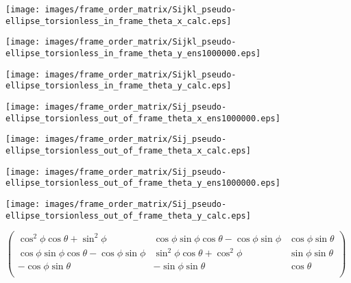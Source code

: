 \documentclass[a4paper,11pt,twoside,openright]{book}
\def\lthtmlcheckvsize{\ifdim\ht\sizebox<\vsize 
  \ifdim\wd\sizebox<\hsize\expandafter\hfill\fi \expandafter\vfill
  \else\expandafter\vss\fi}%
\begin{document}
{\newpage\clearpage
{}%
\texttt{[image: images/frame\_order\_matrix/Sijkl\_pseudo-ellipse\_torsionless\_in\_frame\_theta\_x\_calc.eps]}%
\lthtmlpictureZ
\lthtmlcheckvsize\clearpage}

{\newpage\clearpage
{}%
\texttt{[image: images/frame\_order\_matrix/Sijkl\_pseudo-ellipse\_torsionless\_in\_frame\_theta\_y\_ens1000000.eps]}%
\lthtmlpictureZ
\lthtmlcheckvsize\clearpage}

{\newpage\clearpage
{}%
\texttt{[image: images/frame\_order\_matrix/Sijkl\_pseudo-ellipse\_torsionless\_in\_frame\_theta\_y\_calc.eps]}%
\lthtmlpictureZ
\lthtmlcheckvsize\clearpage}

{\newpage\clearpage
{}%
\texttt{[image: images/frame\_order\_matrix/Sij\_pseudo-ellipse\_torsionless\_out\_of\_frame\_theta\_x\_ens1000000.eps]}%
\lthtmlpictureZ
\lthtmlcheckvsize\clearpage}

{\newpage\clearpage
{}%
\texttt{[image: images/frame\_order\_matrix/Sij\_pseudo-ellipse\_torsionless\_out\_of\_frame\_theta\_x\_calc.eps]}%
\lthtmlpictureZ
\lthtmlcheckvsize\clearpage}

{\newpage\clearpage
{}%
\texttt{[image: images/frame\_order\_matrix/Sij\_pseudo-ellipse\_torsionless\_out\_of\_frame\_theta\_y\_ens1000000.eps]}%
\lthtmlpictureZ
\lthtmlcheckvsize\clearpage}

{\newpage\clearpage
{}%
\texttt{[image: images/frame\_order\_matrix/Sij\_pseudo-ellipse\_torsionless\_out\_of\_frame\_theta\_y\_calc.eps]}%
\lthtmlpictureZ
\lthtmlcheckvsize\clearpage}

{\newpage\clearpage
{}%
$\displaystyle \begin{pmatrix}
\cos^2\phi \cos\theta + \sin^2\phi               & \cos\phi \sin\phi \cos\theta - \cos\phi \sin\phi & \cos\phi \sin\theta \\
\cos\phi \sin\phi \cos\theta - \cos\phi \sin\phi & \sin^2\phi \cos\theta + \cos^2\phi               & \sin\phi \sin\theta \\
- \cos\phi \sin\theta                            & - \sin\phi \sin\theta                            & \cos\theta \\
\end{pmatrix}$%
\lthtmlindisplaymathZ
\lthtmlcheckvsize\clearpage}
\end{document}
